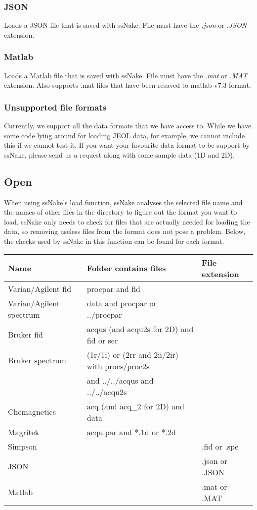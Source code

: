 \documentclass[11pt,a4paper]{article}
\begin{document}
\subsubsection*{JSON}
Loads a JSON file that is saved with ssNake. File must have the \textit{.json} or \textit{.JSON} extension.

\subsubsection*{Matlab}
Loads a Matlab file that is saved with ssNake. File must have the \textit{.mat} or \textit{.MAT} extension. Also supports .mat files that have been resaved to matlab v7.3 format.


\subsubsection*{Unsupported file formats}
Currently, we support all the data formats that we have access to. While we have some code lying around for loading JEOL data, for example, we cannot include this if we cannot test it. If you want your favourite data format to be support by ssNake, please send us a request along with some sample data (1D and 2D).

\subsection{Open}
When using ssNake's load function, ssNake analyses the selected file name and the names of other files in the directory to figure out the format you want to load. ssNake only needs to check for files that are actually needed for loading the data, so removing useless files from the format does not pose a problem. Below, the checks used by ssNake in this function can be found for each format.

\begin{center}
\begin{tabular}{lll}
\toprule
Name & Folder contains files & File extension\\
\midrule
\rowcolor{gray!30!white}
Varian/Agilent fid &  procpar and fid & \\
Varian/Agilent spectrum&  data and procpar or ../procpar & \\
\rowcolor{gray!30!white}
Bruker fid &  acqus (and acqu2s for 2D) and fid or ser &\\
Bruker spectrum & (1r/1i) or (2rr and 2ii/2ir) with procs/proc2s  &\\
 &and ../../acqus and ../../acqu2s & \\
\rowcolor{gray!30!white}
Chemagnetics &  acq (and acq\_2 for 2D) and data &\\
Magritek &  acqu.par and *.1d or *.2d&\\
\rowcolor{gray!30!white}
Simpson &  & .fid or .spe \\
JSON & & .json or .JSON\\
\rowcolor{gray!30!white}
Matlab & & .mat or .MAT\\
\bottomrule
\end{tabular}
\end{center}
\end{document}
